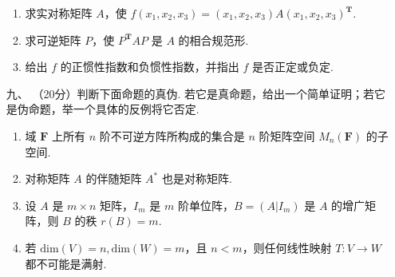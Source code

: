 \begin{enumerate}
\begin{enumerate}[label=(\arabic*)]
        \item 求实对称矩阵 $A$，使 $f(x_1,x_2,x_3)=(x_1,x_2,x_3)A(x_1,x_2,x_3)^{\mathbf{T}}.$
        \item 求可逆矩阵 $P$，使 $P^\mathbf{T}AP$ 是 $A$ 的相合规范形.
        \item 给出 $f$ 的正惯性指数和负惯性指数，并指出 $f$ 是否正定或负定.
    \end{enumerate}
    \item [九、]（20分）判断下面命题的真伪. 若它是真命题，给出一个简单证明；若它是伪命题，举一个具体的反例将它否定.
    \begin{enumerate}[label=(\arabic*)]
        \item 域 $\mathbf{F}$ 上所有 $n$ 阶不可逆方阵所构成的集合是 $n$ 阶矩阵空间 $M_n(\mathbf{F})$ 的子空间.
        \item 对称矩阵 $A$ 的伴随矩阵 $A^*$ 也是对称矩阵.
        \item 设 $A$ 是 $m\times n$ 矩阵，$I_m$ 是 $m$ 阶单位阵，$B=(A|I_m)$ 是 $A$ 的增广矩阵，则 $B$ 的秩 $r(B)=m.$
        \item 若 $\mathrm{dim}(V) = n,\mathrm{dim}(W) = m$，且 $n < m$，则任何线性映射 $T:V\to W$ 都不可能是满射.
    \end{enumerate}
\end{enumerate}

\newpage
